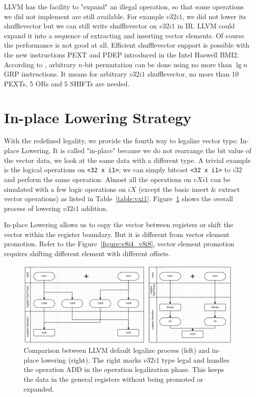 LLVM has the facility to "expand" an illegal operation, so that some operations we did not implement are still available. For example $v32i1$, we did not lower its shufflevector but we can still write shufflevector on $v32i1$ in IR\@. LLVM could expand it into a sequence of extracting and inserting vector elements. Of course the performance is not good at all. Efficient shufflevector support is possible with the new instructions PEXT and PDEP introduced in the Intel Haswell BMI2. According to \cite{lee2001efficient}, arbitrary $n$-bit permutation can be done using no more than $\lg n$ GRP instructions. It means for arbitrary $v32i1$ shufflevector, no more than 10 PEXTs, 5 ORs and 5 SHIFTs are needed.

\section{In-place Lowering Strategy}

With the redefined legality, we provide the fourth way to legalize vector type: In-place Lowering. It is called "in-place" because we do not rearrange the bit value of the vector data, we look at the same data with a different type. A trivial example is the logical operations on \verb|<32 x i1>|; we can simply bitcast \verb|<32 x i1>| to $i32$ and perform the same operation. Almost all the operations on $vXi1$ can be simulated with a few logic operations on $iX$ (except the basic insert \& extract vector operations) as listed in Table~\ref{table:vxi1}. Figure~\ref{figure:v32i1_compare} shows the overall process of lowering $v32i1$ addition.

In-place Lowering allows us to copy the vector between registers or shift the vector within the register boundary. But it is different from vector element promotion. Refer to the Figure~\ref{figure:v8i4_v8i8}, vector element promotion requires shifting different element with different offsets.

\begin{figure}[ht!]
  \centering
  \includegraphics[width=150mm]{draw/v32i1_compare.png}
  \caption[Comparison between LLVM default legalize process and in-place lowering.]{Comparison between LLVM default legalize process (left) and in-place lowering (right). The right marks $v32i1$ type legal and handles the operation ADD in the operation legalization phase. This keeps the data in the general registers without being promoted or expanded.}
  \label{figure:v32i1_compare}
\end{figure}


